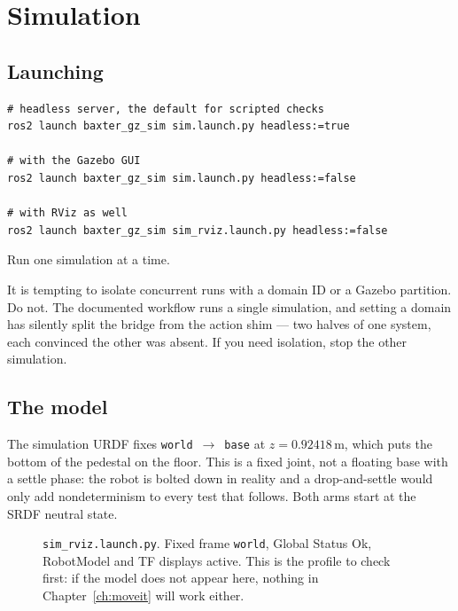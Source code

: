 \chapter{Simulation}
\label{ch:sim}

\section{Launching}

\begin{lstlisting}
# headless server, the default for scripted checks
ros2 launch baxter_gz_sim sim.launch.py headless:=true

# with the Gazebo GUI
ros2 launch baxter_gz_sim sim.launch.py headless:=false

# with RViz as well
ros2 launch baxter_gz_sim sim_rviz.launch.py headless:=false
\end{lstlisting}

Run one simulation at a time.

\begin{notebox}
It is tempting to isolate concurrent runs with a domain ID or a Gazebo partition.
Do not. The documented workflow runs a single simulation, and setting a domain has
silently split the bridge from the action shim --- two halves of one system, each
convinced the other was absent. If you need isolation, stop the other simulation.
\end{notebox}

\section{The model}

The simulation URDF fixes \texttt{world}~$\rightarrow$~\texttt{base} at
$z=0.92418$\,m, which puts the bottom of the pedestal on the floor. This is a
fixed joint, not a floating base with a settle phase: the robot is bolted down in
reality and a drop-and-settle would only add nondeterminism to every test that
follows. Both arms start at the SRDF neutral state.

\begin{figure}[h]
\centering
{}
\caption{\texttt{sim\_rviz.launch.py}. Fixed frame \texttt{world}, Global Status
Ok, RobotModel and TF displays active. This is the profile to check first: if the
model does not appear here, nothing in Chapter~\ref{ch:moveit} will work either.}
\label{fig:simrviz}
\end{figure}

